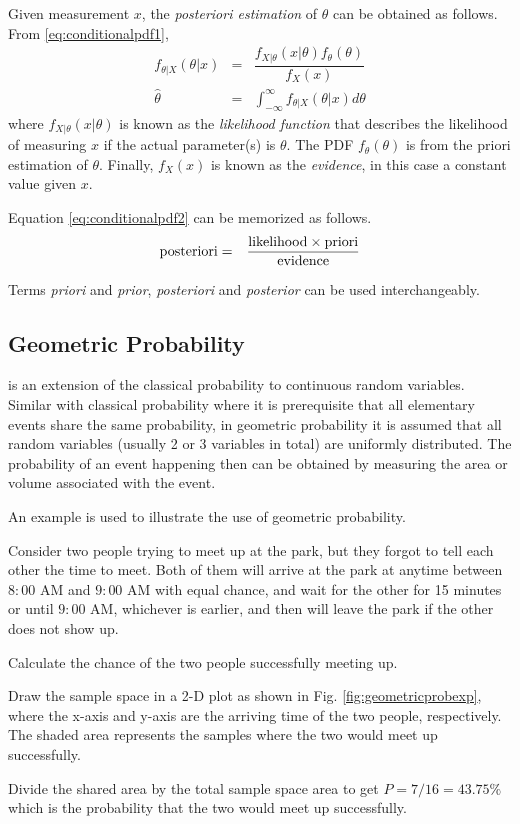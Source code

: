 Given measurement $x$, the \textit{posteriori estimation} of $\theta$ can be obtained as follows. From \eqref{eq:conditionalpdf1},
\begin{eqnarray}
  f_{\theta|X}(\theta|x) &=& \dfrac{f_{X|\theta}(x|\theta)f_\theta(\theta)}{f_X(x)} \label{eq:conditionalpdf2} \\
  \hat{\theta} &=& \int_{-\infty}^{\infty} f_{\theta|X}(\theta|x) d\theta \nonumber
\end{eqnarray}
where $f_{X|\theta}(x|\theta)$ is known as the \textit{likelihood function} that describes the likelihood of measuring $x$ if the actual parameter(s) is $\theta$. The PDF $f_\theta(\theta)$ is from the priori estimation of $\theta$. Finally, $f_X(x)$ is known as the \textit{evidence}, in this case a constant value given $x$.

Equation \eqref{eq:conditionalpdf2} can be memorized as follows.
\begin{eqnarray}
  \textup{posteriori} &=& \dfrac{\textup{likelihood}\times\textup{priori}}{\textup{evidence}} \label{eq:posteriorimemo}
\end{eqnarray}

Terms \textit{priori} and \textit{prior}, \textit{posteriori} and \textit{posterior} can be used interchangeably.

\subsection{Geometric Probability}

 is an extension of the classical probability to continuous random variables. Similar with classical probability where it is prerequisite that all elementary events share the same probability, in geometric probability it is assumed that all random variables (usually 2 or 3 variables in total) are uniformly distributed. The probability of an event happening then can be obtained by measuring the area or volume associated with the event.

An example is used to illustrate the use of geometric probability.

\begin{shortbox}
Consider two people trying to meet up at the park, but they forgot to tell each other the time to meet. Both of them will arrive at the park at anytime between $8:00$ AM and $9:00$ AM with equal chance, and wait for the other for 15 minutes or until $9:00$ AM, whichever is earlier, and then will leave the park if the other does not show up.

Calculate the chance of the two people successfully meeting up.

Draw the sample space in a 2-D plot as shown in Fig. \ref{fig:geometricprobexp}, where the x-axis and y-axis are the arriving time of the two people, respectively. The shaded area represents the samples where the two would meet up successfully.

Divide the shared area by the total sample space area to get $P=7/16=43.75\%$ which is the probability that the two would meet up successfully.
\end{shortbox}

